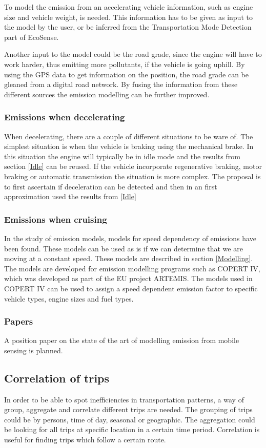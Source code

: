 To model the emission from an accelerating vehicle information, such as engine size and vehicle weight, is needed. This information has to be given as input to the model by the user, or be inferred from the Transportation Mode Detection part of EcoSense.

Another input to the model could be the road grade, since the engine will have to work harder, thus emitting more pollutants, if the vehicle is going uphill. By using the GPS data to get information on the position, the road grade can be gleaned from a digital road network. By fusing the information from these different sources the emission modelling  can be further improved.  

\subsubsection{Emissions when decelerating}
When decelerating, there are a couple of different situations to be ware of. The simplest situation is when the vehicle is braking using the mechanical brake. In this situation the engine will typically be in idle mode and the results from section \ref{Idle} can be reused. If the vehicle incorporate regenerative braking, motor braking or automatic transmission the situation is more complex. The proposal is to first ascertain if deceleration can be detected and then in an first approximation used the results from \ref{Idle}
\subsubsection{Emissions when cruising}
In the study of emission models, models for speed dependency of emissions have been found. These models can be used as is if we can determine that we are moving at a constant speed. These models are described in section \ref{Modelling}. The models are developed for emission modelling programs such as COPERT IV, which was developed as part of the EU project ARTEMIS. The models used in COPERT IV can be used to assign a speed dependent emission factor to specific vehicle types, engine sizes and fuel types.
 
\subsubsection{Papers}
A position paper on the state of the art of modelling emission from mobile sensing is planned.

\subsection{Correlation of trips}
In order to be able to spot inefficiencies in transportation patterns, a way of group, aggregate and correlate different trips are needed. The grouping of trips could be by persons, time of day, seasonal or geographic. The aggregation could be looking for all trips at specific location in a certain time period. Correlation is useful for finding trips which follow a certain route.

